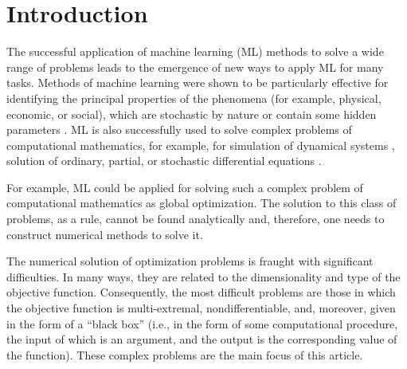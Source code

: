 \documentclass[entropy,article,submit,moreauthors,pdftex]{Definitions/mdpi}
\begin{document}

\section{Introduction}


The successful application of machine learning (ML) methods to solve a wide range of problems leads to the emergence of new ways to apply ML for many tasks. 
Methods of machine learning were shown to be particularly effective for identifying the principal properties of the phenomena (for example, physical, economic, or social), which are stochastic by nature or contain some hidden parameters \cite{Golovenkin2020,Gonoskov2019}.
ML is also successfully used to solve complex problems of computational mathematics, for example, for simulation of dynamical systems  \cite{Seleznev2019}, solution of ordinary, partial, or stochastic differential equations \cite{Lagaris1998,Blechschmidt2021,Xu2020}.

For example, ML could be applied for solving such a complex problem of computational mathematics as global optimization.
The solution to this class of problems, as a rule, cannot be found analytically and, therefore, one needs to construct numerical methods to solve it.

The numerical solution of optimization problems is fraught with significant difficulties. In many ways, they are related to the dimensionality and type of the objective function. Consequently, the most difficult problems are those in which the objective function is multi-extremal, nondifferentiable, and, moreover, given in the form of a ``black box'' (i.e., in the form of some computational procedure, the input of which is an argument, and the output is the corresponding value of the function). These complex problems are the main focus of this article.
\end{document}

